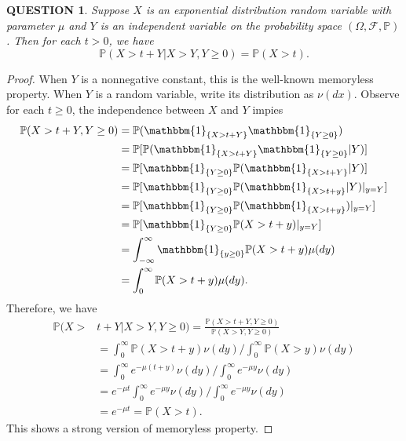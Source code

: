 \documentclass[12pt]{article}
\renewcommand{\(}{\left(}%
\renewcommand{\)}{\right)}%
\renewcommand{\[}{\left[}%
\renewcommand{\]}{\right]}%
\newcommand{\p}{\mathbb{P}}
\newcommand{\f}{\mathscr{F}}
\newtheorem{question}{QUESTION}[section]}
\newtheorem{proof}{Proof.}}
\begin{document}
  \begin{question}
   Suppose $X$ is an exponential distribution random variable with parameter $\mu$ and $Y$ is an independent variable on the probability space $(\Omega,\f,\p )$. Then for each $t>0$, we have
   \begin{equation*}
    \p(X>t+Y|X>Y,Y\geq 0)=\p(X>t).
   \end{equation*}
  \end{question}
  \begin{proof}
   When $Y$ is a nonnegative constant, this is the well-known memoryless property. When $Y$ is a random variable, write its distribution as $\nu(dx)$. Observe for each $t\geq 0$, the independence between $X$ and $Y$ impies
   \begin{equation*}
    \begin{split}
     \p(X>t+Y,Y\geq 0)&=\p(\mathbbm{1}_{\{X>t+Y\}}\mathbbm{1}_{\{Y\geq 0\}})\\
     &=\p[\p(\mathbbm{1}_{\{X>t+Y\}}\mathbbm{1}_{\{Y\geq 0\}}|Y)]\\
     &=\p[\mathbbm{1}_{\{Y\geq 0\}}\p(\mathbbm{1}_{\{X>t+Y\}}|Y)]\\
     &=\p[\mathbbm{1}_{\{Y\geq 0\}}\p(\mathbbm{1}_{\{X>t+y\}}|Y)|_{y=Y}]\\
     &=\p[\mathbbm{1}_{\{Y\geq 0\}}\p(\mathbbm{1}_{\{X>t+y\}})|_{y=Y}]\\
     &=\p[\mathbbm{1}_{\{Y\geq 0\}}\p(X>t+y)|_{y=Y}]\\
     &=\int_{-\infty}^\infty \mathbbm{1}_{\{y\geq 0\}}\p(X>t+y)\mu(dy)\\
     &=\int_0^\infty\p(X>t+y)\mu(dy).
    \end{split}
   \end{equation*}
   Therefore, we have
   \begin{equation*}
    \begin{split}
     \p(X>&t+Y|X>Y,Y\geq 0)=\frac{\p(X>t+Y,Y\geq 0)}{\p(X>Y,Y\geq 0)}\\
     &=\int_0^\infty  \p(X>t+y)\nu( dy)\bigg/\int_0^\infty \p(X>y)\nu( dy) \\
     &=\int_0^\infty   e^{-\mu(t+y)} \nu( dy)\bigg/\int_0^\infty  e^{-\mu y} \nu( dy)\\
     &=e^{-\mu t}\int_0^\infty  e^{-\mu y} \nu( dy)\bigg/\int_0^\infty  e^{-\mu y} \nu( dy) \\
     &=e^{-\mu t}=\p(X>t).
    \end{split}
   \end{equation*}
   This shows a {\sffamily strong} version of {\sffamily memoryless property}.
  \end{proof}
\end{document}
